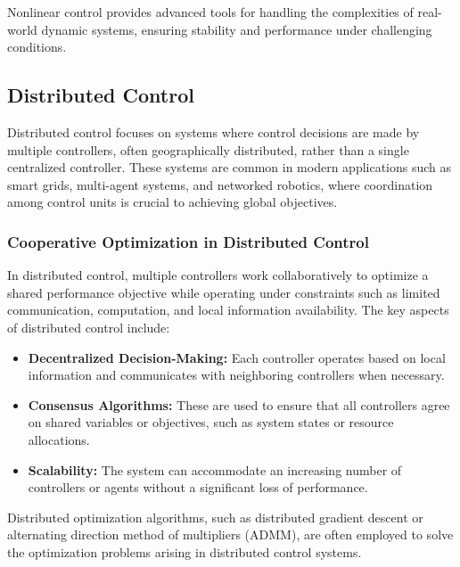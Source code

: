 \documentclass{IEEEojcsys}
\begin{document}
Nonlinear control provides advanced tools for handling the complexities of real-world dynamic systems, ensuring stability and performance under challenging conditions.

\subsection{Distributed Control}
Distributed control focuses on systems where control decisions are made by multiple controllers, often geographically distributed, rather than a single centralized controller. These systems are common in modern applications such as smart grids, multi-agent systems, and networked robotics, where coordination among control units is crucial to achieving global objectives.

\subsubsection{Cooperative Optimization in Distributed Control}
In distributed control, multiple controllers work collaboratively to optimize a shared performance objective while operating under constraints such as limited communication, computation, and local information availability. The key aspects of distributed control include:
\begin{itemize}
    \item \textbf{Decentralized Decision-Making:} Each controller operates based on local information and communicates with neighboring controllers when necessary.
    \item \textbf{Consensus Algorithms:} These are used to ensure that all controllers agree on shared variables or objectives, such as system states or resource allocations.
    \item \textbf{Scalability:} The system can accommodate an increasing number of controllers or agents without a significant loss of performance.
\end{itemize}

Distributed optimization algorithms, such as distributed gradient descent or alternating direction method of multipliers (ADMM), are often employed to solve the optimization problems arising in distributed control systems.
\end{document}
